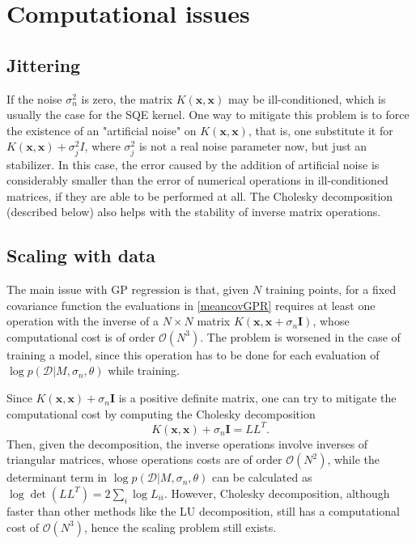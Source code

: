 \section{Computational issues}
\subsection{Jittering}
If the noise $\sigma_n^2$ is zero, the matrix $K(\mathbf{x},\mathbf{x})$ may be ill-conditioned, which is usually the case for the SQE kernel. One way to mitigate this problem is to force the existence of an "artificial noise" on $K(\mathbf{x},\mathbf{x})$, that is, one substitute it for $K(\mathbf{x},\mathbf{x}) + \sigma^2_j I$, where $\sigma^2_j$ is not a real noise parameter now, but just an stabilizer. In this case, the error caused by the addition of artificial noise is considerably smaller than the error of numerical operations in ill-conditioned matrices, if they are able to be performed at all. The Cholesky decomposition (described below) also helps with the stability of inverse matrix operations.

\subsection{Scaling with data}\label{scalinggpsession}
The main issue with GP regression is that, given $N$ training points, for a fixed covariance function the evaluations in \eqref{meancovGPR} requires at least one operation with the inverse of a $N \times N$ matrix $K(\mathbf{x},\mathbf{x} + \sigma_n \mathbf{I})$, whose computational cost is of order $\mathcal{O}(N^3)$. The problem is worsened in the case of training a model, since this operation has to be done for each evaluation of $\log p(\mathcal{D}|M,\sigma_n,\theta)$ while training. 

Since $K(\mathbf{x},\mathbf{x}) + \sigma_n \mathbf{I}$ is a positive definite matrix, one can try to mitigate the computational cost by computing the Cholesky decomposition
\begin{displaymath}
K(\mathbf{x},\mathbf{x}) + \sigma_n \mathbf{I} = L L^T.
\end{displaymath}
Then, given the decomposition, the inverse operations involve inverses of triangular matrices, whose operations costs are of order $\mathcal{O}(N^2)$, while the determinant term in $\log p(\mathcal{D}|M,\sigma_n,\theta)$ can be calculated as $\log \det (L L^T) = 2 \sum_i \log L_{ii}$. However, Cholesky decomposition, although faster than other methods like the LU decomposition, still has a computational cost of $\mathcal{O}(N^3)$, hence the scaling problem still exists.

